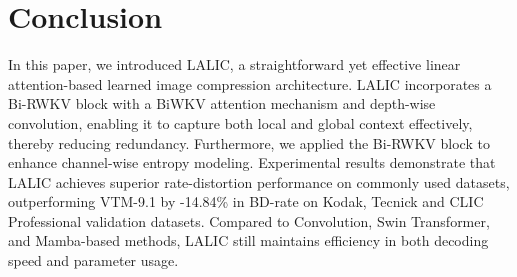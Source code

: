 \section{Conclusion}

In this paper, we introduced LALIC, a straightforward yet effective linear attention-based learned image compression architecture. LALIC incorporates a Bi-RWKV block with a BiWKV attention mechanism and depth-wise convolution, enabling it to capture both local and global context effectively, thereby reducing redundancy. Furthermore, we applied the Bi-RWKV block to enhance channel-wise entropy modeling. Experimental results demonstrate that LALIC achieves superior rate-distortion performance on commonly used datasets, outperforming VTM-9.1 by -14.84\% in BD-rate on Kodak, Tecnick and CLIC Professional validation datasets. Compared to Convolution, Swin Transformer, and Mamba-based methods, LALIC still maintains efficiency in both decoding speed and parameter usage.
